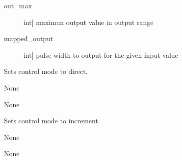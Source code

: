 \documentclass[letterpaper,10pt,english]{sphinxmanual}
\begin{document}
\begin{fulllineitems}
\begin{fulllineitems}
\begin{description}
\item[{out\_max}] \leavevmode{[}int{]}
\sphinxAtStartPar
maximun output value in output range

\end{description}

\sphinxAtStartPar
{}
\begin{description}
\item[{mapped\_output}] \leavevmode{[}int{]}
\sphinxAtStartPar
pulse width to output for the given input value

\end{description}

\end{fulllineitems}


\begin{fulllineitems}
\label{\detokenize{generic:AnalogMixerOutput.AnalogMixerOutput.set_control_direct}}
\sphinxAtStartPar
Sets control mode to direct.

\sphinxAtStartPar
{}

\sphinxAtStartPar
None

\sphinxAtStartPar
{}

\sphinxAtStartPar
None

\end{fulllineitems}


\begin{fulllineitems}
\label{\detokenize{generic:AnalogMixerOutput.AnalogMixerOutput.set_control_increment}}
\sphinxAtStartPar
Sets control mode to increment.

\sphinxAtStartPar
{}

\sphinxAtStartPar
None

\sphinxAtStartPar
{}

\sphinxAtStartPar
None

\end{fulllineitems}


\end{fulllineitems}
\end{document}
